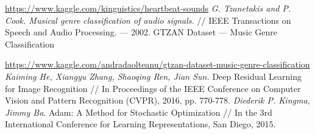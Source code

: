 \documentclass[12pt, fleqn]{article}
\begin{document}
\begin{thebibliography}{3}
	\url{https://www.kaggle.com/kinguistics/heartbeat-sounds}
    \textit{G. Tzanetakis and P. Cook. Musical genre classification of audio signals.}    // IEEE Transactions on Speech and Audio Processing. --- 2002.
    GTZAN Dataset --- Music Genre Classification
    
    \url{https://www.kaggle.com/andradaolteanu/gtzan-dataset-music-genre-classification}
    \textit{Kaiming He, Xiangyu Zhang, Shaoqing Ren, Jian Sun.} Deep Residual Learning for Image Recognition // In Proceedings of the IEEE Conference on Computer Vision and Pattern Recognition (CVPR), 2016, pp. 770-778.
	\textit{Diederik P. Kingma, Jimmy Ba}. Adam: A Method for Stochastic Optimization // In the 3rd International Conference for Learning Representations, San Diego, 2015.
	
\end{thebibliography}
\end{document}
